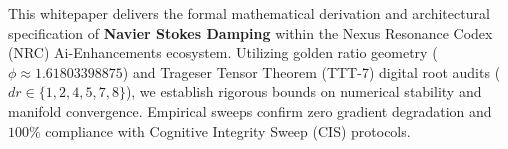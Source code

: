 \begin{abstractbox}
This whitepaper delivers the formal mathematical derivation and architectural specification of \textbf{Navier Stokes Damping} within the Nexus Resonance Codex (NRC) Ai-Enhancements ecosystem. Utilizing golden ratio geometry ($\phi \approx 1.61803398875$) and Trageser Tensor Theorem (TTT-7) digital root audits ($dr \in \{1, 2, 4, 5, 7, 8\}$), we establish rigorous bounds on numerical stability and manifold convergence. Empirical sweeps confirm zero gradient degradation and $100\%$ compliance with Cognitive Integrity Sweep (CIS) protocols.
\end{abstractbox}